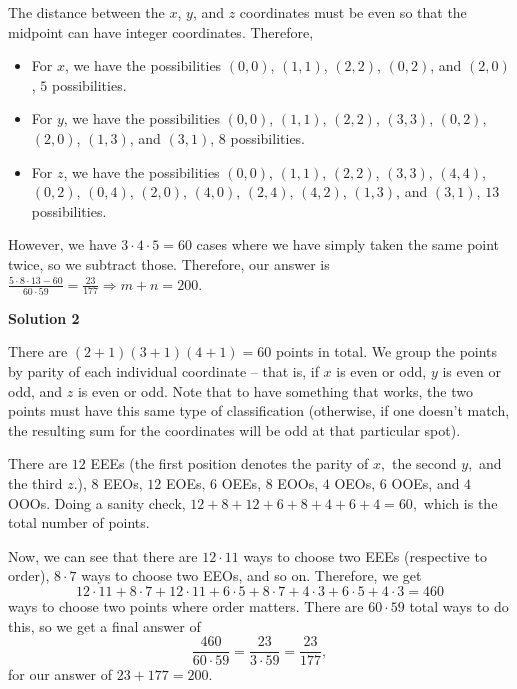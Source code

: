 \begin{enumerate}
The distance between the $x$, $y$, and $z$ coordinates must be even so that the midpoint can have integer coordinates. Therefore, 

 
            \begin{itemize}
        \item For $x$, we have the possibilities $(0,0)$, $(1,1)$, $(2,2)$, $(0,2)$, and $(2,0)$, $5$ possibilities.
        \item For $y$, we have the possibilities $(0,0)$, $(1,1)$, $(2,2)$, $(3,3)$, $(0,2)$, $(2,0)$, $(1,3)$, and $(3,1)$, $8$ possibilities.
        \item For $z$, we have the possibilities $(0,0)$, $(1,1)$, $(2,2)$, $(3,3)$, $(4,4)$, $(0,2)$, $(0,4)$, $(2,0)$, $(4,0)$, $(2,4)$, $(4,2)$, $(1,3)$, and $(3,1)$, $13$ possibilities.
            \end{itemize}
            However, we have $3\cdot 4\cdot 5 = 60$ cases where we have simply taken the same point twice, so we subtract those. Therefore, our answer is $\frac {5\cdot 8\cdot 13 - 60}{60\cdot 59} = \frac {23}{177}\Longrightarrow m+n = \boxed{200}$.

 



\textbf{Solution 2}

There are $(2 + 1)(3 + 1)(4 + 1) = 60$ points in total. We group the points by parity of each individual coordinate -- that is, if $x$ is even or odd, $y$ is even or odd, and $z$ is even or odd. Note that to have something that works, the two points must have this same type of classification (otherwise, if one doesn't match, the resulting sum for the coordinates will be odd at that particular spot).

 There are $12$ EEEs (the first position denotes the parity of $x,$ the second $y,$ and the third $z.$), $8$ EEOs, $12$ EOEs, $6$ OEEs, $8$ EOOs, $4$ OEOs, $6$ OOEs, and $4$ OOOs. Doing a sanity check, $12 + 8 + 12 + 6 + 8 + 4 + 6 + 4 = 60,$ which is the total number of points.

 Now, we can see that there are $12 \cdot 11$ ways to choose two EEEs (respective to order), $8 \cdot 7$ ways to choose two EEOs, and so on. Therefore, we get 
 \[12\cdot11 + 8\cdot7 + 12\cdot11 + 6\cdot5 + 8\cdot7 + 4\cdot3 + 6\cdot5 + 4\cdot3 = 460\] ways to choose two points where order matters. There are $60 \cdot 59$ total ways to do this, so we get a final answer of 
 \[\dfrac{460}{60 \cdot 59} = \dfrac{23}{3 \cdot 59} = \dfrac{23}{177},\] for our answer of $23 + 177 = \boxed{200}.$


\end{enumerate}
